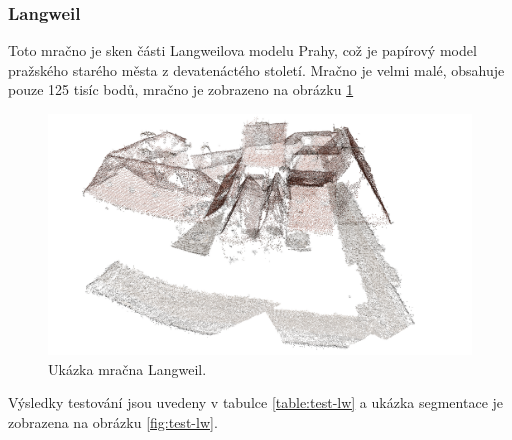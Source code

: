 \documentclass[11pt,twoside,a4paper]{book}
\begin{document}
\cleardoublepage
\subsubsection{Langweil}

Toto mračno je sken části Langweilova modelu Prahy, což je papírový model pražského starého města z devatenáctého století. Mračno je velmi malé, obsahuje pouze 125 tisíc bodů, mračno je zobrazeno na obrázku \ref{fig:langweil}

\begin{figure}[H]
\begin{center}
\includegraphics[width=\textwidth]{figures/langweil}
\caption{Ukázka mračna Langweil.}
\label{fig:langweil}
\end{center}
\end{figure}

Výsledky testování jsou uvedeny v tabulce \ref{table:test-lw} a ukázka segmentace je zobrazena na obrázku \ref{fig:test-lw}.
\end{document}
